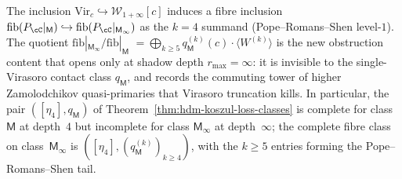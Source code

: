 \begin{remark}
\label{rem:hdm-m-vs-minfty}
The inclusion $\mathrm{Vir}_c \hookrightarrow \mathcal W_{1+\infty}[c]$
induces a fibre inclusion
$\mathrm{fib}(P_\cC|_{\mathsf M}) \hookrightarrow
\mathrm{fib}(P_\cC|_{\mathsf M_\infty})$ as the $k=4$ summand
(Pope--Romans--Shen level-$1$). The quotient
$\mathrm{fib}|_{\mathsf M_\infty}/\mathrm{fib}|_\mathsf M$
$= \bigoplus_{k\geq 5}q_\mathsf M^{(k)}(c)\cdot\langle W^{(k)}\rangle$
is the new obstruction content that opens only at shadow depth
$r_{\max}=\infty$: it is invisible to the single-Virasoro contact
class $q_\mathsf M$, and records the commuting tower of higher
Zamolodchikov quasi-primaries that Virasoro truncation kills. In
particular, the pair $([\eta_4], q_\mathsf M)$ of
Theorem~\ref{thm:hdm-koszul-loss-classes} is complete for class
$\mathsf M$ at depth~$4$ but incomplete for class $\mathsf M_\infty$
at depth~$\infty$; the complete fibre class on class~$\mathsf M_\infty$
is $([\eta_4], (q_\mathsf M^{(k)})_{k\geq 4})$, with the $k\geq 5$
entries forming the Pope--Romans--Shen tail.
\end{remark}

